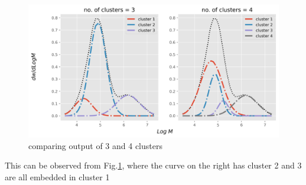 \documentclass[12pt,letter]{article}
\begin{document}
\begin{figure}[!htb]
	\begin{center}
	\includegraphics[width=\textwidth]{figures/comparison_nclusters}
	\caption{comparing output of 3 and 4 clusters}
	\label{fig:comparison}
	\end{center}
\end{figure}
 This can be observed from Fig.\ref{fig:comparison}, where the curve on the right has cluster 2 and 3 are all embedded in cluster 1
\end{document}
